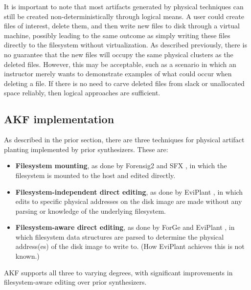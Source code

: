 \documentclass[letterpaper,12pt]{report}
\def\tightlist{}
\begin{document}
It is important to note that most artifacts generated by physical
techniques can still be created non-deterministically through logical
means. A user could create files of interest, delete them, and then
write new files to disk through a virtual machine, possibly leading to
the same outcome as simply writing these files directly to the
filesystem without virtualization. As described previously, there is no
guarantee that the new files will occupy the same physical clusters as
the deleted files. However, this may be acceptable, such as a scenario
in which an instructor merely wants to demonstrate examples of what
could occur when deleting a file. If there is no need to carve deleted
files from slack or unallocated space reliably, then logical approaches
are sufficient.

\subsection{AKF implementation}\label{akf-implementation}

As described in the prior section, there are three techniques for
physical artifact planting implemented by prior synthesizers. These are:

\begin{itemize}
\tightlist
\item
  \textbf{Filesystem mounting}, as done by Forensig2
  \cite{mochForensicImageGenerator2009} and SFX
  \cite{russellForensicImageDescription2012}, in which the
  filesystem is mounted to the host and edited directly.
\item
  \textbf{Filesystem-independent direct editing}, as done by EviPlant
  \cite{scanlonEviPlantEfficientDigital2017}, in which edits to
  specific physical addresses on the disk image are made without any
  parsing or knowledge of the underlying filesystem.
\item
  \textbf{Filesystem-aware direct editing}, as done by ForGe
  \cite{vistiAutomaticCreationComputer2015} and EviPlant
  \cite{scanlonEviPlantEfficientDigital2017}, in which filesystem
  data structures are parsed to determine the physical address(es) of
  the disk image to write to. (How EviPlant achieves this is not known.)
\end{itemize}

AKF supports all three to varying degrees, with significant improvements
in filesystem-aware editing over prior synthesizers. ~
\end{document}
